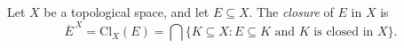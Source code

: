 \begin{definition}\label{def:topological-closure}
Let \(X\) be a topological space, and let \(E\subseteq X\).  The
\emph{closure} of \(E\) in \(X\) is
\[
\overline{E}^{\,X}
=
\mathrm{Cl}_{X}(E)
=
\bigcap\{K\subseteq X:E\subseteq K\text{ and }K\text{ is closed in }X\}.
\]
\end{definition}